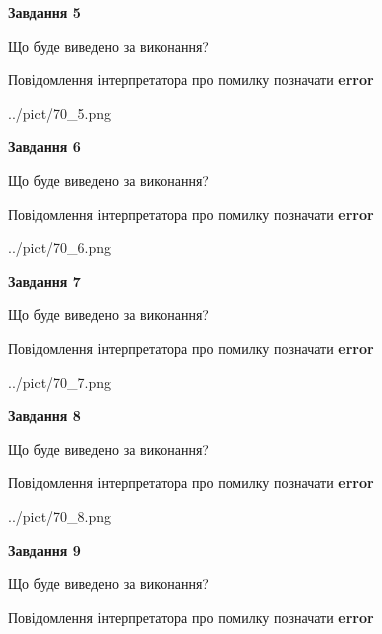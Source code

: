 \documentclass[11pt, ukrainian]{article}
\begin{document}
{\begin {large}
{\begin {center}\textbf{Завдання 5}\end {center}}\par
Що буде виведено за виконання? \par
Повідомлення інтерпретатора про помилку позначати \textbf{error}

\begin{center}
	{../pict/70_5.png}
\end{center}
\newpage

{\begin {center}\textbf{Завдання 6}\end {center}}\par
Що буде виведено за виконання? \par
Повідомлення інтерпретатора про помилку позначати \textbf{error}

\begin{center}
	{../pict/70_6.png}
\end{center}
\newpage

{\begin {center}\textbf{Завдання 7}\end {center}}\par
Що буде виведено за виконання? \par
Повідомлення інтерпретатора про помилку позначати \textbf{error}

\begin{center}
	{../pict/70_7.png}
\end{center}
\newpage

{\begin {center}\textbf{Завдання 8}\end {center}}\par
Що буде виведено за виконання? \par
Повідомлення інтерпретатора про помилку позначати \textbf{error}

\begin{center}
	{../pict/70_8.png}
\end{center}
\newpage

{\begin {center}\textbf{Завдання 9}\end {center}}\par
Що буде виведено за виконання? \par
Повідомлення інтерпретатора про помилку позначати \textbf{error}


\end{large}}
\end{document}
